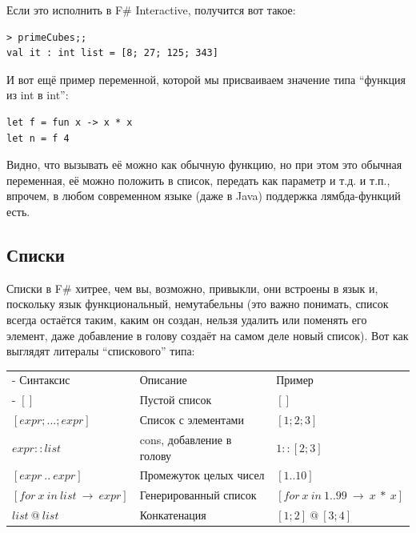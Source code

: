 \documentclass[a5paper]{article}
\begin{document}
Если это исполнить в F\# Interactive, получится вот такое:

\begin{verbatim}
> primeCubes;;
val it : int list = [8; 27; 125; 343]
\end{verbatim}

И вот ещё пример переменной, которой мы присваиваем значение типа ``функция из int в int'':

\begin{verbatim}
let f = fun x -> x * x
let n = f 4
\end{verbatim}

Видно, что вызывать её можно как обычную функцию, но при этом это обычная переменная, её можно положить в список, передать как параметр и т.д. и т.п., впрочем, в любом современном языке (даже в Java) поддержка лямбда-функций есть.

\subsection{Списки}

Списки в F\# хитрее, чем вы, возможно, привыкли, они встроены в язык и, поскольку язык функциональный, немутабельны (это важно понимать, список всегда остаётся таким, каким он создан, нельзя удалить или поменять его элемент, даже добавление в голову создаёт на самом деле новый список). Вот как выглядят литералы ``спискового'' типа:

\begin{tabu} {| X[0.9 l p] | X[1 l p] | X[1 l p] |}
	\tabucline-
	Синтаксис                               & Описание                  & Пример                             \\
	\tabucline-
	\everyrow{\tabucline-}
	$[]$                                    & Пустой список             & $[]$                               \\
	$[expr; ...; expr]$                     & Список с элементами       & $[1; 2; 3]$                        \\
	$expr :: list$                          & cons, добавление в голову & $1 :: [2; 3]$                      \\
	$[expr\ ..\ expr]$                      & Промежуток целых чисел    & $[1 .. 10]$                        \\
	$[for\ x\ in\ list\ \rightarrow\ expr]$ & Генерированный список     & $[for\ x\ in\ 1..99\ \rightarrow\ x\ *\ x]$ \\
	$list\ @\ list$                         & Конкатенация              & $[1; 2]\ @\ [3; 4]$                \\
\end{tabu}
\end{document}
